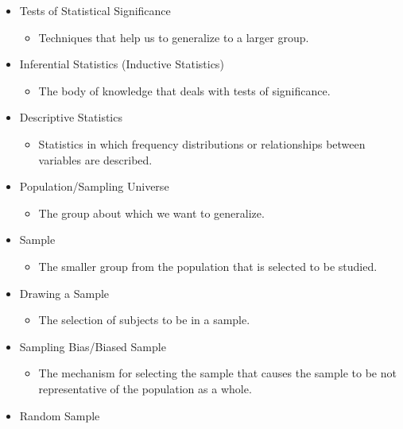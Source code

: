 \documentclass[]{article}
\begin{document}
\begin{itemize}
\itemsep1pt\parskip0pt
\item
  Tests of Statistical Significance

  \begin{itemize}
  \itemsep1pt\parskip0pt
  \item
    Techniques that help us to generalize to a larger group.
  \end{itemize}
\item
  Inferential Statistics (Inductive Statistics)

  \begin{itemize}
  \itemsep1pt\parskip0pt
  \item
    The body of knowledge that deals with tests of significance.
  \end{itemize}
\item
  Descriptive Statistics

  \begin{itemize}
  \itemsep1pt\parskip0pt
  \item
    Statistics in which frequency distributions or relationships between
    variables are described.
  \end{itemize}
\item
  Population/Sampling Universe

  \begin{itemize}
  \itemsep1pt\parskip0pt
  \item
    The group about which we want to generalize.
  \end{itemize}
\item
  Sample

  \begin{itemize}
  \itemsep1pt\parskip0pt
  \item
    The smaller group from the population that is selected to be
    studied.
  \end{itemize}
\item
  Drawing a Sample

  \begin{itemize}
  \itemsep1pt\parskip0pt
  \item
    The selection of subjects to be in a sample.
  \end{itemize}
\item
  Sampling Bias/Biased Sample

  \begin{itemize}
  \itemsep1pt\parskip0pt
  \item
    The mechanism for selecting the sample that causes the sample to be
    not representative of the population as a whole.
  \end{itemize}
\item
  Random Sample


\end{itemize}
\end{document}
